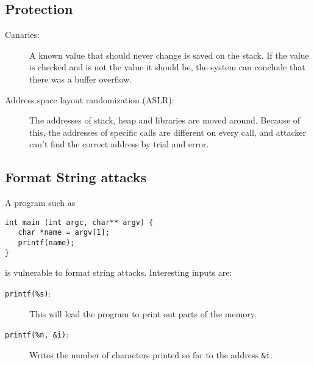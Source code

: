 \subsection{Protection}
\begin{description}
  \item[Canaries:] A known value that should never change is saved on the
    stack. If the value is checked and is not the value it should be, the
    system can conclude that there was a buffer overflow.
  \item [Address space layout randomization (ASLR):] The addresses of
    stack, heap and libraries are moved around. Because of this, the
    addresses of specific calls are different on every call, and
    attacker can't find the correct address by trial and error.
\end{description}

\subsection{Format String attacks}
A program such as
\begin{lstlisting}
int main (int argc, char** argv) {
   char *name = argv[1];
   printf(name);
}
\end{lstlisting}
is vulnerable to format string attacks. Interesting inputs are:
\begin{description}
  \item[\texttt{printf(\%s)}:] This will lead the program to print out parts of
    the memory.
  \item[\texttt{printf(\%n, \&i)}:] Writes the number of characters printed so
    far to the address \texttt{\&i}.
\end{description}

